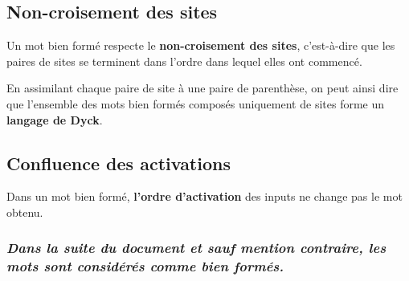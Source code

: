 \subsection{Non-croisement des sites}
\label{subsec:formalisme/proprietes/croisement}
\par
Un mot bien formé respecte le \textbf{non-croisement des sites}, c'est-à-dire que les paires de sites se terminent dans l'ordre dans lequel elles ont commencé.\\
\par
En assimilant chaque paire de site à une paire de parenthèse, on peut ainsi dire que l'ensemble des mots bien formés composés uniquement de sites forme un \textbf{langage de Dyck}\protect\footnotemark.

\subsection{Confluence des activations}
\label{subsec:formalisme/proprietes/confluence}
\par
Dans un mot bien formé, \textbf{l'ordre d'activation} des inputs ne change pas le mot obtenu.\\

\vspace{0.2cm}
\subsubsection*{\textit{Dans la suite du document et sauf mention contraire, les mots sont considérés comme bien formés.}}